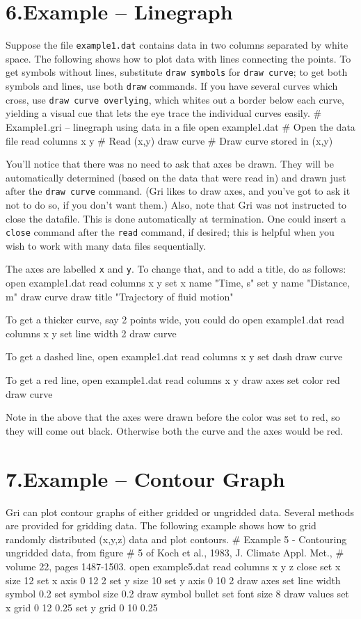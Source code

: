 \section{6.\quad Example -- Linegraph}
Suppose the file {\tt example1.dat} contains data in two columns
separated by white space.  The following shows how to plot data with
lines connecting the points.  To get symbols without lines, substitute
{\tt draw symbols} for {\tt draw curve}; to get both symbols and
lines, use both {\tt draw} commands.  If you have several curves which
cross, use {\tt draw curve overlying}, which whites out a border below
each curve, yielding a visual cue that lets the eye trace the
individual curves easily.
\beginexample
\# Example1.gri -- linegraph using data in a file
open example1.dat      \# Open the data file
read columns x y       \# Read (x,y)
draw curve             \# Draw curve stored in (x,y)
\endexample

You'll notice that there was no need to ask that axes be drawn.  They
will be automatically determined (based on the data that were read in)
and drawn just after the {\tt draw curve} command.  (Gri likes to draw
axes, and you've got to ask it not to do so, if you don't want them.)
Also, note that Gri was not instructed to close the datafile.  This is
done automatically at termination.  One could insert a {\tt close}
command after the {\tt read} command, if desired; this is helpful when
you wish to work with many data files sequentially.

The axes are labelled {\tt x} and {\tt y}.  To change that, and to add
a title, do as follows:
\beginexample
open example1.dat
read columns x y
set x name "Time, s"
set y name "Distance, m"
draw curve
draw title "Trajectory of fluid motion"
\endexample

To get a thicker curve, say 2 points wide, you could do
\beginexample
open example1.dat
read columns x y
set line width 2
draw curve
\endexample

To get a dashed line,
\beginexample
open example1.dat
read columns x y
set dash
draw curve
\endexample

To get a red line,
\beginexample
open example1.dat
read columns x y
draw axes
set color red
draw curve
\endexample

Note in the above that the axes were drawn before the color was set to
red, so they will come out black.  Otherwise both the curve and the
axes would be red.


\section{7.\quad Example -- Contour Graph}
Gri can plot contour graphs of either gridded or ungridded data.
Several methods are provided for gridding data.  The following example
shows how to grid randomly distributed (x,y,z) data and plot contours.
\beginexample
\# Example 5 - Contouring ungridded data, from figure
\# 5 of Koch et al., 1983, J. Climate Appl. Met.,
\# volume 22, pages 1487-1503.
open example5.dat
read columns x y z
close
set x size 12
set x axis 0 12 2
set y size 10
set y axis 0 10 2
draw axes
set line width symbol 0.2
set symbol size 0.2
draw symbol bullet
set font size 8
draw values
set x grid 0 12 0.25
set y grid 0 10 0.25

